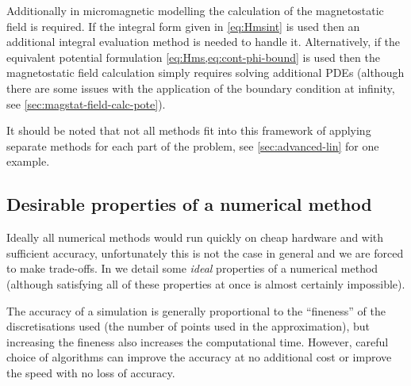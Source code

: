 Additionally in micromagnetic modelling the calculation of the magnetostatic field is required.
If the integral form given in \cref{eq:Hmsint} is used then an additional integral evaluation method is needed to handle it.
Alternatively, if the equivalent potential formulation \cref{eq:Hms,eq:cont-phi-bound} is used then the magnetostatic field calculation simply requires solving additional PDEs (although there are some issues with the application of the boundary condition at infinity, see \cref{sec:magstat-field-calc-pote}).

It should be noted that not all methods fit into this framework of applying separate methods for each part of the problem, see \cref{sec:advanced-lin} for one example.



\subsection{Desirable properties of a numerical method}
\label{sec:desir-prop-numer}

Ideally all numerical methods would run quickly on cheap hardware and with sufficient accuracy, unfortunately this is not the case in general and we are forced to make trade-offs.
In  we detail some \emph{ideal} properties of a numerical method (although satisfying all of these properties at once is almost certainly impossible).

The accuracy of a simulation is generally proportional to the ``fineness''  of the discretisations used (\ie the number of points used in the approximation), but increasing the fineness also increases the computational time.
However, careful choice of algorithms can improve the accuracy at no additional cost or improve the speed with no loss of accuracy.


